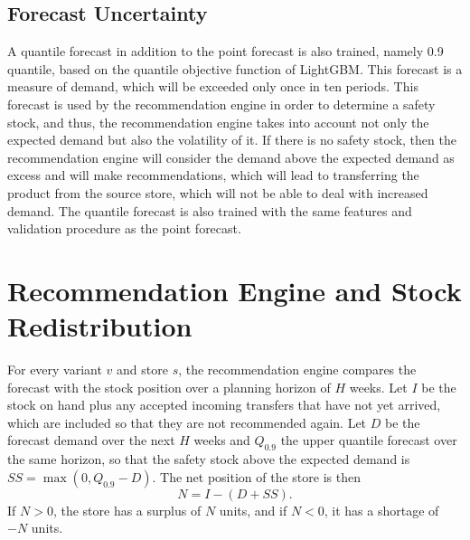 \documentclass{StockSense}
\begin{document}
\subsection{Forecast Uncertainty}

A quantile forecast in addition to the point forecast is also trained, namely 0.9 quantile, based on the quantile objective function of LightGBM. This forecast is a measure of demand, which will be exceeded only once in ten periods. This forecast is used by the recommendation engine in order to determine a safety stock, and thus, the recommendation engine takes into account not only the expected demand but also the volatility of it. If there is no safety stock, then the recommendation engine will consider the demand above the expected demand as excess and will make recommendations, which will lead to transferring the product from the source store, which will not be able to deal with increased demand. The quantile forecast is also trained with the same features and validation procedure as the point forecast.

\section{Recommendation Engine and Stock Redistribution}
\label{sec:recommendation}

For every variant $v$ and store $s$, the recommendation engine compares the forecast with the stock position over a planning horizon of $H$ weeks. Let $I$ be the stock on hand plus any accepted incoming transfers that have not yet arrived, which are included so that they are not recommended again. Let $D$ be the forecast demand over the next $H$ weeks and $Q_{0.9}$ the upper quantile forecast over the same horizon, so that the safety stock above the expected demand is $SS = \max(0,Q_{0.9}-D)$. The net position of the store is then
\begin{equation}
    N = I - (D + SS).
\end{equation}
If $N > 0$, the store has a surplus of $N$ units, and if $N < 0$, it has a shortage of $-N$ units.
\end{document}
